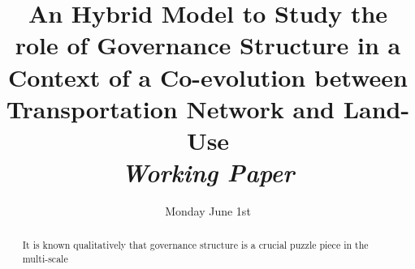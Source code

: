 


\title{An Hybrid Model to Study the role of Governance Structure in a Context of a Co-evolution between Transportation Network and Land-Use\bigskip\\
\textit{Working Paper}
}
\author{}
\date{Monday June 1st}


\maketitle

\justify


\begin{abstract}
It is known qualitatively that governance structure is a crucial puzzle piece in the multi-scale 
\end{abstract}


























